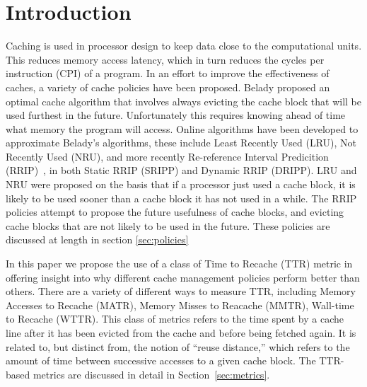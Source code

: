\section{Introduction}
Caching is used in processor design to keep data close to the computational units.
This reduces memory access latency, which in turn reduces the cycles per instruction (CPI) of a program.
In an effort to improve the effectiveness of caches, a variety of cache policies have been proposed.
Belady proposed an optimal cache algorithm that involves always evicting the cache block that will be used furthest in the future.
Unfortunately this requires knowing ahead of time what memory the program will access.
Online algorithms have been developed to approximate Belady's algorithms,
	these include Least Recently Used (LRU), Not Recently Used (NRU),
	and more recently Re-reference Interval Predicition (RRIP)~\cite{jaleeltheobald10},
	in both Static RRIP (SRIPP) and Dynamic RRIP (DRIPP).
LRU and NRU were proposed on the basis that if a processor just used a cache block,
	it is likely to be used sooner than a cache block it has not used in a while.
The RRIP policies attempt to propose the future usefulness of cache blocks,
	and evicting cache blocks that are not likely to be used in the future.
These policies are discussed at length in section \ref{sec:policies}

In this paper we propose the use of a class of Time to Recache (TTR) metric in offering insight into why different cache management policies perform better than others.  
There are a variety of different ways to measure TTR, including Memory Accesses to Recache (MATR), Memory Misses to Reacache (MMTR), Wall-time to Recache (WTTR). 
This class of metrics refers to the time spent by a cache line after it has been evicted from the cache and before being fetched again.  
It is related to, but distinct from, the notion of ``reuse distance,'' which refers to the amount of time between successive accesses to a given cache block.
The TTR-based metrics are discussed in detail in Section~\ref{sec:metrics}.

